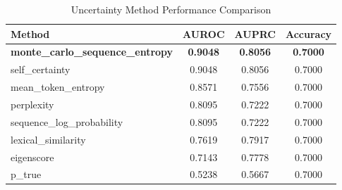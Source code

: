 \begin{table}[htbp]
\centering
\caption{Uncertainty Method Performance Comparison}
\label{tab:uq_performance}
\begin{tabular}{lccc}
\hline
Method & AUROC & AUPRC & Accuracy \\
\hline
\textbf{monte_carlo_sequence_entropy} & \textbf{0.9048} & \textbf{0.8056} & \textbf{0.7000} \\
self_certainty & 0.9048 & 0.8056 & 0.7000 \\
mean_token_entropy & 0.8571 & 0.7556 & 0.7000 \\
perplexity & 0.8095 & 0.7222 & 0.7000 \\
sequence_log_probability & 0.8095 & 0.7222 & 0.7000 \\
lexical_similarity & 0.7619 & 0.7917 & 0.7000 \\
eigenscore & 0.7143 & 0.7778 & 0.7000 \\
p_true & 0.5238 & 0.5667 & 0.7000 \\
\hline
\end{tabular}
\end{table}